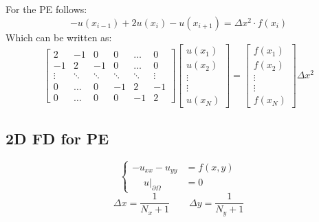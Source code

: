         For the PE follows:
        $$
            - u(x_{i-1}) + 2 u(x_i) - u(x_{i+1}) = \Delta x^2 \cdot f(x_i)
        $$
        Which can be written as:
        $$
            \!\!\!
            \begin{bmatrix}
                2 & -1 &  0 & 0 & \dots & 0 \\
                -1 &  2 & -1 & 0 & \dots & 0 \\
                \vdots & \ddots & \ddots & \ddots & \ddots & \vdots \\
                0 & \dots & 0 & -1 &  2 & -1 \\
                0 & \dots & 0 & 0 &  -1 &  2 
            \end{bmatrix}
            \!\!\!
            \begin{bmatrix}
                u(x_1) \\ u(x_2) \\ \vdots \\ \vdots\\ u(x_N)
            \end{bmatrix}
            \!\!
            = 
            \!\!
            \begin{bmatrix}
                f(x_1) \\ f(x_2) \\ \vdots \\ \vdots\\ f(x_N)
            \end{bmatrix}
            \!
            \Delta x^2
        $$
\subsection{2D FD for PE}
    \vspace{-0.5em}
    $$
        \begin{cases}
            -u_{xx} - u_{yy} &= f(x,y)\\
            \phantom{-}u\rvert_{\partial \Omega} &= 0
        \end{cases}
    $$
    $$
        \Delta x = \frac{1}{N_x+1} \qquad \Delta y = \frac{1}{N_y+1}
    $$
